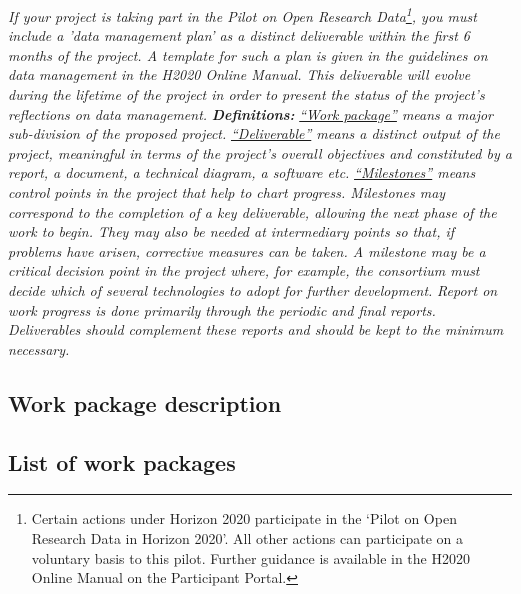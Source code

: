 {\vskip0.2cm
\emph{If your project is taking part in the Pilot on Open Research Data\footnote{Certain actions under Horizon 2020 participate in the ‘Pilot on Open Research Data in Horizon 2020’. All other actions can participate on a voluntary basis to this pilot.  Further guidance is available in the H2020 Online Manual on the Participant Portal.}, you must include a 'data management plan' as a distinct deliverable within the first 6 months of the project. A template for such a plan is given in the guidelines on data management in the H2020 Online Manual. This deliverable will evolve during the lifetime of the project in order to present the status of the project's reflections on data management.}
\vskip0.2cm
\emph{\noindent \textbf{Definitions:}}
\vskip0.2cm
\emph{\ul{``Work package''} means a major sub-division of the proposed project.}
\vskip0.2cm
\emph{\ul{``Deliverable''} means a distinct output of the project, meaningful in terms of the project's overall objectives and constituted by a report, a document, a technical diagram, a software etc.}
\vskip0.2cm
\emph{\ul{``Milestones''} means control points in the project that help to chart progress. Milestones may correspond to the completion of a key deliverable, allowing the next phase of the work to begin. They may also be needed at intermediary points so that, if problems have arisen, corrective measures can be taken. A milestone may be a critical decision point in the project where, for example, the consortium must decide which of several technologies to adopt for further development.}
\vskip0.2cm
\emph{\noindent Report on work progress is done primarily through the periodic and final reports. Deliverables should complement these reports and should be kept to the minimum necessary.}
}

%

\subsection{Work package description}
\label{sec:wps}




\subsection{List of work packages}
\label{sec:wplist}
\makewplist

